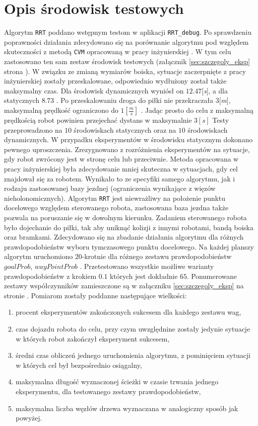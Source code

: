 \section{Opis środowisk testowych}
Algorytm \texttt{RRT} poddano wstępnym testom w aplikacji \texttt{RRT\_debug}. Po sprawdzeniu poprawności działania zdecydowano się na porównanie algorytmu pod względem skuteczności
z metodą \texttt{CVM} opracowaną w pracy inżynierskiej \cite{inzynierka}. W tym celu zastosowano ten sam zestaw środowisk testowych (załącznik \ref{sec:szczegoly_eksp} strona \pageref{sec:srodowiska_testowe}).
W związku ze zmianą wymiarów boiska, sytuacje zaczerpnięte z pracy inżynierskiej zostały przeskalowane, odpowiednio wydłużony został także maksymalny czas. Dla środowisk
dynamicznych wyniósł on $12.47$[\textit{s}], a dla statycznych $8.73$ . Po przeskalowaniu droga do piłki nie przekraczała $3$[\textit{m}], maksymalną prędkość ograniczono do
$1[\frac{m}{s}]$ . Jadąc prosto do celu z maksymalną prędkością robot powinien przejechać dystans w maksymalnie $3[s]$
Testy przeprowadzono na $10$ środowiskach statycznych oraz na $10$ środowiskach dynamicznych. W przypadku eksperymentów w środowisku statycznym dokonano pewnego uproszczenia.
Zrezygnowano z rozróżnienia eksperymentów na sytuacje, gdy robot zwrócony jest w stronę celu lub przeciwnie. Metoda opracowana w pracy inżynierskiej była zdecydowanie mniej skuteczna w sytuacjach,
gdy cel znajdował się za robotem. Wynikało to ze specyfiki samego algorytmu, jak i 
rodzaju zastosowanej bazy jezdnej (ograniczenia wynikające z więzów nieholonomicznych). Algorytm \texttt{RRT} jest niewrażliwy na położenie punktu docelowego względem
sterowanego robota, zastosowana baza jezdna także pozwala na poruszanie się w dowolnym kierunku.
Zadaniem sterowanego robota było dojechanie do piłki, tak aby uniknąć kolizji z innymi robotami, bandą boiska oraz bramkami.
Zdecydowano się na zbadanie działania algorytmu dla różnych prawdopodobieństw wyboru tymczasowego punktu docelowego. Na każdej planszy algorytm uruchomiono $20$-krotnie dla różnego zestawu
prawdopodobieństw $goalProb$, $wayPointProb$ . Przetestowano wszystkie możliwe warianty prawdopodobieństw z krokiem $0.1$ których jest dokładnie $65$. Ponumerowane zestawy współczynników zamieszczone są w 
załączniku \ref{sec:szczegoly_eksp} na stronie \pageref{sec:srodowiska_testowe}.
Pomiarom zostały poddanne następujące wielkości:
\begin{enumerate}
 \item procent eksperymentów zakończonych sukcesem dla każdego zestawu wag,
 \item czas dojazdu robota do celu, przy czym uwzględnine zostały jedynie sytuacje w których robot zakończył eksperyment sukcesem,
 \item średni czas obliczeń jednego uruchomienia algorytmu, z pominięciem sytuacji w których cel był bezpośrednio osiągalny,
 \item maksymalna długość wyznaczonej ścieżki w czasie trwania jednego eksperymentu, dla testowanego zestawy prawdopodobieństw,
 \item maksymalna liczba węzłów drzewa wyznaczana w analogiczny sposób jak powyżej.  
\end{enumerate}
